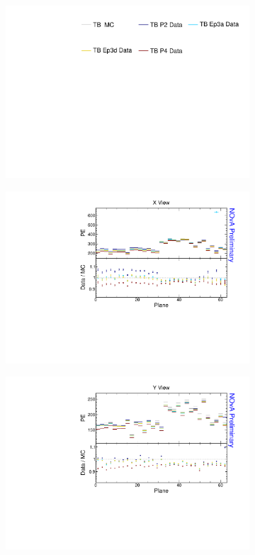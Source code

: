 \begin{figure}[!ht]
  \begin{subfigure}{\textwidth}
  \centering
    \includegraphics[height=0.2\linewidth]{essentialsec_tb/legend.pdf}
  \end{subfigure}
  \vspace*{2mm}

  \begin{subfigure}{0.495\textwidth}
    \includegraphics[width=\linewidth]{essentialsec_tb/pe_plane_x.pdf}
  \end{subfigure}
  \begin{subfigure}{0.495\textwidth}
    \includegraphics[width=\linewidth]{essentialsec_tb/pe_plane_y.pdf}

\end{subfigure}
\end{figure}
